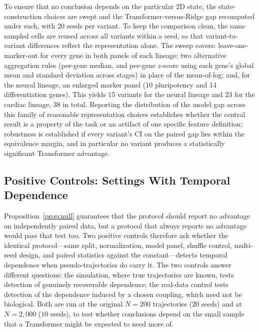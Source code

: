 \documentclass[pdflatex,sn-mathphys-num]{sn-jnl}
\theoremstyle{thmstyleone}%
\theoremstyle{thmstyletwo}%
\theoremstyle{thmstylethree}%
\begin{document}
To ensure that no conclusion depends on the particular 2D state, the state-construction choices are swept and the Transformer-versus-Ridge gap recomputed under each, with 20 seeds per variant. To keep the comparison clean, the same sampled cells are reused across all variants within a seed, so that variant-to-variant differences reflect the representation alone. The sweep covers: leave-one-marker-out for every gene in both panels of each lineage; two alternative aggregation rules (per-gene median, and per-gene $z$-score using each gene's global mean and standard deviation across stages) in place of the mean-of-log; and, for the neural lineage, an enlarged marker panel (10 pluripotency and 14 differentiation genes). This yields 15 variants for the neural lineage and 23 for the cardiac lineage, 38 in total. Reporting the distribution of the model gap across this family of reasonable representation choices establishes whether the central result is a property of the task or an artifact of one specific feature definition; robustness is established if every variant's CI on the paired gap lies within the equivalence margin, and in particular no variant produces a statistically significant Transformer advantage.

\subsection{\textbf{Positive Controls: Settings With Temporal Dependence}}
\label{subsec:positive}

Proposition~\ref{prop:null} guarantees that the protocol should report no advantage on independently paired data, but a protocol that always reports no advantage would pass that test too. Two positive controls therefore ask whether the identical protocol---same split, normalization, model panel, shuffle control, multi-seed design, and paired statistics against the constant---detects temporal dependence when pseudo-trajectories do carry it. The two controls answer different questions: the simulation, where true trajectories are known, tests detection of genuinely recoverable dependence; the real-data control tests detection of the dependence induced by a chosen coupling, which need not be biological. Both are run at the original $N=200$ trajectories ($20$ seeds) and at $N=2{,}000$ ($10$ seeds), to test whether conclusions depend on the small sample that a Transformer might be expected to need more of.
\end{document}
